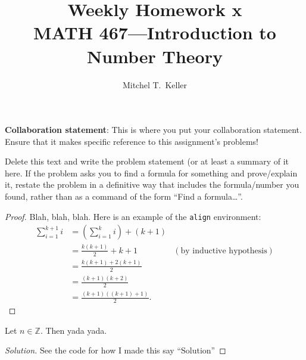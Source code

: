 \documentclass[12pt]{amsart}
\newcommand{\Z}{\mathbb{Z}} %
\newenvironment{theorem}[2][Theorem]{\begin{trivlist}
\item[\hskip \labelsep {\bfseries #1}\hskip \labelsep {\bfseries #2.}]}{\end{trivlist}}
\newenvironment{problem}[2][Problem]{\begin{trivlist}
\item[\hskip \labelsep {\bfseries #1}\hskip \labelsep {\bfseries #2.}]}{\end{trivlist}}
\begin{document}
 
\title{Weekly Homework x\\MATH 467---Introduction to Number Theory}
\author{Mitchel T.\ Keller}
\maketitle

\noindent\textbf{Collaboration statement}: This is where you put your
collaboration statement. Ensure that it makes specific reference to
this assignment's problems!

\begin{problem}{x} %
Delete this text and write the problem statement (or at least a
summary of it here. If the problem asks you to find a formula for
something and prove/explain it, restate the problem in a definitive
way that includes the formula/number you found, rather than as a
command of the form ``Find a formula\dots''. 
\end{problem}
 
\begin{proof}
Blah, blah, blah.  Here is an example of the \texttt{align} environment:
\begin{align*}
\sum_{i=1}^{k+1}i & = \left(\sum_{i=1}^{k}i\right) +(k+1)\\ 
& = \frac{k(k+1)}{2}+k+1 & (\text{by inductive hypothesis})\\
& = \frac{k(k+1)+2(k+1)}{2}\\
& = \frac{(k+1)(k+2)}{2}\\
& = \frac{(k+1)((k+1)+1)}{2}.
\end{align*}
\end{proof}
 
\begin{theorem}{x.yz}
Let \(n\in \Z\).  Then yada yada.
\end{theorem}
 
\begin{proof}[Solution] %
  See the code for how I made this say ``Solution''

\end{proof}
\end{document}
